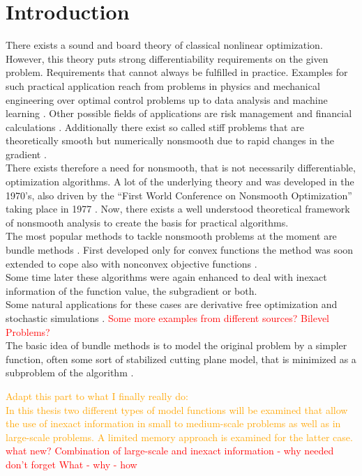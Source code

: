 \section{Introduction}

There exists a sound and board theory of classical nonlinear optimization. However, this theory puts strong differentiability requirements on the given problem. Requirements that cannot always be fulfilled in practice.
Examples for such practical application reach from problems in physics and mechanical engineering \cite{Clarke1990} over optimal control problems up to data analysis \cite{Bagirov2014} and machine learning \cite{Smola2007}.
Other possible fields of applications are risk management and financial calculations \cite{Nesterov2016,Teo2010}. 
Additionally there exist so called stiff problems that are theoretically smooth but numerically nonsmooth due to rapid changes in the gradient \cite{Maekelae1992}. \\
There exists therefore a need for nonsmooth, that is not necessarily differentiable, optimization algorithms. A lot of the underlying theory and was developed in the 1970's, also driven by the ``First World Conference on Nonsmooth Optimization'' taking place in 1977 \cite{Mifflin2012}.
Now, there exists a well understood theoretical framework of nonsmooth analysis to create the basis for practical algorithms. \\
The most popular methods to tackle nonsmooth problems at the moment are bundle methods \cite{Hare2016}. First developed only for convex functions \cite{Lemarechal1978} the method was soon extended to cope also with nonconvex objective functions \cite{Mifflin1982}. \\
Some time later these algorithms were again enhanced to deal with inexact information of the function value, the subgradient or both.\\
Some natural applications for these cases are derivative free optimization and stochastic simulations \cite{Hare2016}. \textcolor{red}{Some more examples from different sources? Bilevel Problems?} \\


The basic idea of bundle methods is to model the original problem by a simpler function, often some sort of stabilized cutting plane model, that is minimized as a subproblem of the algorithm \cite{Hiriart-Urruty1993}. 

\textcolor{orange}{Adapt this part to what I finally really do: \\
In this thesis two different types of model functions will be examined that allow the use of inexact information in small to medium-scale problems as well as in large-scale problems. A limited memory approach is examined for the latter case. \\}
\textcolor{red}{what new? Combination of large-scale and inexact information - why needed \\
don't forget What - why - how}

